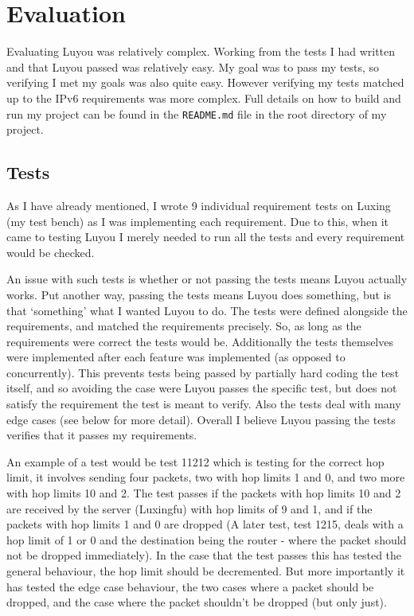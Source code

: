 \documentclass[12pt,a4paper,twoside,openany]{report}
\begin{document}
\chapter{Evaluation}

Evaluating Luyou was relatively complex. Working from the tests I had written and that Luyou passed was relatively easy.  My goal was to pass my tests, so verifying I met my goals was also quite easy.  However verifying my tests matched up to the IPv6 requirements was more complex. Full details on how to build and run my project can be found in the \verb!README.md! file in the root directory of my project. 

\section{Tests}

As I have already mentioned, I wrote 9 individual requirement tests on Luxing (my test bench) as I was implementing each requirement.  Due to this, when it came to testing Luyou I merely needed to run all the tests and every requirement would be checked.

\bigskip

An issue with such tests is whether or not passing the tests means Luyou actually works. Put another way, passing the tests means Luyou does something, but is that `something' what I wanted Luyou to do.  The tests were defined alongside the requirements, and matched the requirements precisely.  So, as long as the requirements were correct the tests would be.  Additionally the tests themselves were implemented after each feature was implemented (as opposed to concurrently).  This prevents tests being passed by partially hard coding the test itself, and so avoiding the case were Luyou passes the specific test, but does not satisfy the requirement the test is meant to verify. Also the tests deal with many edge cases (see below for more detail). Overall I believe Luyou passing the tests verifies that it passes my requirements.

\bigskip

An example of a test would be test 11212 which is testing for the correct hop limit, it involves sending four packets, two with hop limits 1 and 0, and two more with hop limits 10 and 2.  The test passes if the packets with hop limits 10 and 2 are received by the server (Luxingfu) with hop limits of 9 and 1, and if the packets with hop limits 1 and 0 are dropped (A later test, test 1215, deals with a hop limit of 1 or 0 and the destination being the router - where the packet should not be dropped immediately).  In the case that the test passes this has tested the general behaviour, the hop limit should be decremented. But more importantly it has tested the edge case behaviour, the two cases where a packet should be dropped, and the case where the packet shouldn't be dropped (but only just).
\end{document}
